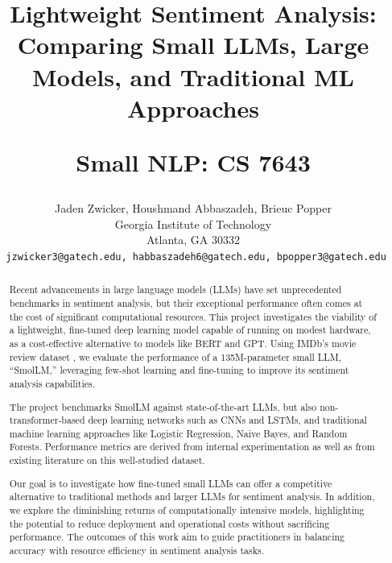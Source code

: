\documentclass[10pt,twocolumn,letterpaper]{article}
\begin{document}
\title{
Lightweight Sentiment Analysis: Comparing Small LLMs, Large Models, and Traditional ML Approaches

Small NLP: CS 7643
}

\author{
Jaden Zwicker, 
Houshmand Abbaszadeh,
Brieuc Popper
\\
Georgia Institute of Technology\\
Atlanta, GA 30332\\
{\tt\small 
jzwicker3@gatech.edu, 
habbaszadeh6@gatech.edu, 
bpopper3@gatech.edu}
}



\maketitle

\begin{abstract}
Recent advancements in large language models (LLMs) have set unprecedented benchmarks in sentiment analysis, but their exceptional performance often comes at the cost of significant computational resources. This project investigates the viability of a lightweight, fine-tuned deep learning model capable of running on modest hardware, as a cost-effective alternative to models like BERT and GPT. Using IMDb’s movie review dataset \cite{IMDB-dataset}, we evaluate the performance of a 135M-parameter small LLM, “SmolLM,” leveraging few-shot learning and fine-tuning to improve its sentiment analysis capabilities.

The project benchmarks SmolLM against state-of-the-art LLMs, but also non-transformer-based deep learning networks such as CNNs and LSTMs, and traditional machine learning approaches like Logistic Regression, Naive Bayes, and Random Forests. Performance metrics are derived from internal experimentation as well as from existing literature on this well-studied dataset.

Our goal is to investigate how fine-tuned small LLMs can offer a competitive alternative to traditional methods and larger LLMs for sentiment analysis. In addition, we explore the diminishing returns of computationally intensive models, highlighting the potential to reduce deployment and operational costs without sacrificing performance. The outcomes of this work aim to guide practitioners in balancing accuracy with resource efficiency in sentiment analysis tasks.

\end{abstract}
\end{document}
